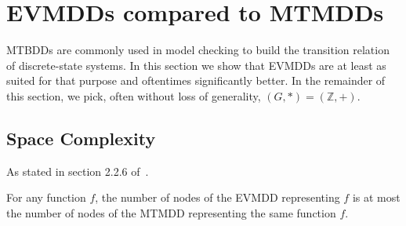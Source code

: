 \documentclass[a4paper,oneside,11pt,pdftex]{llncs}
\newcommand{\Z}{\mathbb{Z}}
\begin{document}
\section{EVMDDs compared to MTMDDs}

MTBDDs are commonly used in model checking to build the transition 
relation of discrete-state systems. In this section we show that EVMDDs 
are at least as suited for that purpose and oftentimes significantly 
better. In the remainder of this section, we pick, often without loss of 
generality, $(G, *) = (\Z, +)$.

\subsection{Space Complexity}

As stated in section 2.2.6 of~\cite{Lai1996}.

\begin{theorem}
  \label{theorem-evmdd-smaller-than-add}
  For any function $f$, the number of nodes of the EVMDD representing $f$
  is at most the number of nodes of the MTMDD representing the same function $f$. 
\end{theorem}
\end{document}
